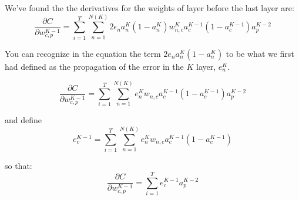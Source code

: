 \documentclass[11pt]{article}
\begin{document}
We've found the the derivatives for the weights of layer before the last layer are:
\begin{equation}
\frac{\partial C}{\partial w_{c,p}^{K-1}} = \sum_{i=1}^{T}\sum_{n=1}^{N(K)} 2\epsilon_{n}a_{n}^{K}(1-a_{n}^{K})w_{n, c}^{K}a_{c}^{K-1}(1-a_{c}^{K-1})a_{p}^{K-2}
\end{equation}

You can recognize in the equation the term \(2e_{n}a_{n}^{K}(1-a_{n}^{K})\) to be what we first had defined as the propagation of the error in the \(K\) layer, \(e_{n}^{K}\).

\begin{equation}
\frac{\partial C}{\partial w_{c,p}^{K-1}} = \sum_{i=1}^{T}\sum_{n=1}^{N(K)}e_{n}^{K}w_{n, c}a_{c}^{K-1}(1-a_{c}^{K-1})a_{p}^{K-2}
\end{equation}

and define
\begin{equation}
e_{c}^{K-1} = \sum_{i=1}^{T}\sum_{n=1}^{N(K)}e_{n}^{K}w_{n, c}a_{c}^{K-1}(1-a_{c}^{K-1})
\end{equation}

so that:
\begin{equation}
\frac{\partial C}{\partial w_{c,p}^{K-1}} = \sum_{i=1}^{T}e_c^{K-1}a_{p}^{K-2}
\end{equation}
\end{document}
